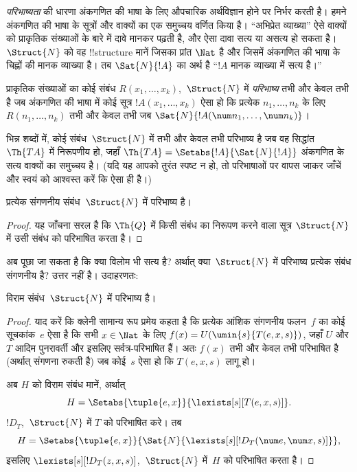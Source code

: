 \documentclass[../../../include/open-logic-section]{subfiles}
\begin{document}


\emph{परिभाष्यता} की धारणा अंकगणित की भाषा के लिए औपचारिक अर्थविज्ञान
होने पर निर्भर करती है। हमने अंकगणित की भाषा के सूत्रों और वाक्यों का एक
समुच्चय वर्णित किया है। ``अभिप्रेत व्याख्या'' ऐसे वाक्यों को प्राकृतिक
संख्याओं के बारे में दावे मानकर पढ़ती है, और ऐसा दावा सत्य या असत्य हो
सकता है। $\Struct{N}$ को वह !!{structure} मानें जिसका प्रांत $\Nat$ है और
जिसमें अंकगणित की भाषा के चिह्नों की मानक व्याख्या है। तब
$\Sat{N}{!A}$ का अर्थ है ``$!A$ मानक व्याख्या में सत्य है।''

\begin{defn}
प्राकृतिक संख्याओं का कोई संबंध $R(x_1,\dots,x_k)$,~$\Struct{N}$ में
\emph{परिभाष्य} तभी और केवल तभी है जब अंकगणित की भाषा में कोई सूत्र
$!A(x_1,\dots,x_k)$ ऐसा हो कि प्रत्येक $n_1,\dots,n_k$ के लिए
$R(n_1,\dots,n_k)$ तभी और केवल तभी जब
$\Sat{N}{!A(\num n_1,\dots,\num n_k)}$।
\end{defn}

भिन्न शब्दों में, कोई संबंध~$\Struct{N}$ में तभी और केवल तभी परिभाष्य है
जब वह सिद्धांत $\Th{TA}$ में निरूपणीय हो, जहाँ
$\Th{TA} = \Setabs{!A}{\Sat{N}{!A}}$ अंकगणित के सत्य वाक्यों का समुच्चय
है। (यदि यह आपको तुरंत स्पष्ट न हो, तो परिभाषाओं पर वापस जाकर जाँचें और
स्वयं को आश्वस्त करें कि ऐसा ही है।)

\begin{lem}
प्रत्येक संगणनीय संबंध~$\Struct{N}$ में परिभाष्य है।
\end{lem}

\begin{proof}
यह जाँचना सरल है कि $\Th{Q}$ में किसी संबंध का निरूपण करने वाला सूत्र
$\Struct{N}$ में उसी संबंध को परिभाषित करता है।
\end{proof}

अब पूछा जा सकता है कि क्या विलोम भी सत्य है? अर्थात् क्या~$\Struct{N}$ में
परिभाष्य प्रत्येक संबंध संगणनीय है? उत्तर नहीं है। उदाहरणतः:

\begin{lem}
विराम संबंध~$\Struct{N}$ में परिभाष्य है।
\end{lem}

\begin{proof}
याद करें कि क्लेनी सामान्य रूप प्रमेय कहता है कि प्रत्येक आंशिक संगणनीय
फलन~$f$ का कोई सूचकांक~$e$ ऐसा है कि सभी $x \in \Nat$ के लिए
$f(x) = U(\umin{s}{T(e,x,s)})$, जहाँ $U$ और $T$ आदिम पुनरावर्ती और इसलिए
सर्वत्र-परिभाषित हैं। अतः $f(x)$ तभी और केवल तभी परिभाषित है (अर्थात्
संगणना रुकती है) जब कोई~$s$ ऐसा हो कि $T(e,x,s)$ लागू हो।

अब $H$ को विराम संबंध मानें, अर्थात्
\[
H = \Setabs{\tuple{e,x}}{\lexists[s][T(e, x, s)]}.
\]
$!D_T$,~$\Struct{N}$ में $T$ को परिभाषित करे। तब
\[
H = \Setabs{\tuple{e,x}}{\Sat{N}{\lexists[s][!D_T(\num e, \num x, s)]}},
\]
इसलिए $\lexists[s][!D_T(z, x, s)]$,~$\Struct{N}$ में~$H$ को परिभाषित
करता है।
\end{proof}
\end{document}

